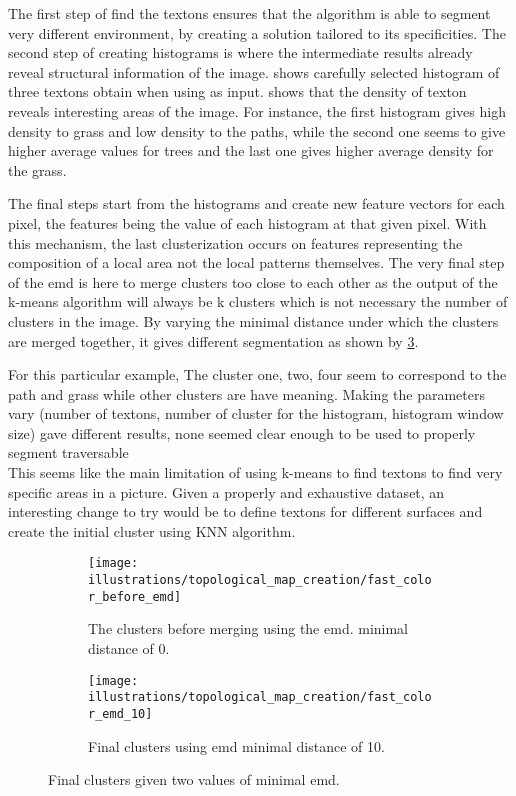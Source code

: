 The first step of find the textons ensures that the algorithm is able to segment very different environment, by
creating a solution tailored to its specificities.
The second step of creating histograms is where the intermediate results already reveal structural information of the image.
 shows carefully selected histogram of three textons obtain when using %
 as input.
 shows that the density of texton reveals interesting areas of the image.
For instance, the first histogram gives high density to grass and low density to the paths, while the second one
seems to give higher average values for trees and the last one gives higher average density for the grass.

The final steps start from the histograms and create new feature vectors for each pixel, the features being the
value of each histogram at that given pixel.
With this mechanism, the last clusterization occurs on features representing the composition of a local area not the
local patterns themselves.
The very final step of the \gls{emd} is here to merge clusters too close to each other as the output of the
k-means algorithm will always be k clusters which is not necessary the number of clusters in the image.
By varying the minimal distance under which the clusters are merged together, it gives different segmentation as shown by
\cref{fig:fast_color:final_cluters_comparaison}.

For this particular example, The cluster one, two, four seem to correspond to the path and grass while other clusters
are have meaning.
Making the parameters vary (number of textons, number of cluster for the histogram, histogram window size) gave different
results, none seemed clear enough to be used to properly segment traversable \\
This seems like the main limitation of using k-means to find textons to find very specific areas in a picture.
Given a properly and exhaustive dataset, an interesting change to try would be to define textons for different surfaces
and create the initial cluster using KNN algorithm.


\begin{figure}
    \begin{subfigure}[t]{0.45\textwidth}
        \texttt{[image: illustrations/topological\_map\_creation/fast\_color\_before\_emd]}
        \caption{The clusters before merging using the \gls{emd}. minimal distance of 0.}
        \label{fig:fast_color:before_emd}
    \end{subfigure}
    \hfill
    \begin{subfigure}[t]{0.45\textwidth}
        \texttt{[image: illustrations/topological\_map\_creation/fast\_color\_emd\_10]}
        \caption{Final clusters using \gls{emd} minimal distance of 10.}
        \label{fig:fast_color:emd_10}
    \end{subfigure}
    \hfill
    \caption{Final clusters given two values of minimal \gls{emd}.}
    \label{fig:fast_color:final_cluters_comparaison}
\end{figure}


